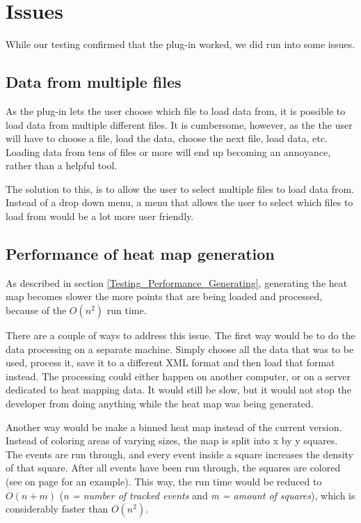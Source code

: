 \section{Issues}
\label{Issues}

While our testing confirmed that the plug-in worked, we did run into some issues.

\subsection{Data from multiple files}
\label{Issues_MoreFiles}

As the plug-in lets the user choose which file to load data from, it is possible to load data from multiple different files. It is cumbersome, however, as the the user will have to choose a file, load the data, choose the next file, load data, etc. Loading data from tens of files or more will end up becoming an annoyance, rather than a helpful tool.

The solution to this, is to allow the user to select multiple files to load data from. Instead of a drop down menu, a menu that allows the user to select which files to load from would be a lot more user friendly.

\subsection{Performance of heat map generation}
\label{Issues_GenerationPerformance}

As described in section \ref{Testing_Performance_Generating}, generating the heat map becomes slower the more points that are being loaded and processed, because of the $O(n^2)$ run time.

There are a couple of ways to address this issue. The first way would be to do the data processing on a separate machine. Simply choose all the data that was to be used, process it, save it to a different XML format and then load that format instead. The processing could either happen on another computer, or on a server dedicated to heat mapping data. It would still be slow, but it would not stop the developer from doing anything while the heat map was being generated.

Another way would be make a binned heat map instead of the current version. Instead of coloring areas of varying sizes, the map is split into x by y squares. The events are run through, and every event inside a square increases the density of that square. After all events have been run through, the squares are colored (see  on page \pageref{fig:HM_B} for an example). This way, the run time would be reduced to $O(n + m)$ (\textit{n = number of tracked events} and \textit{m = amount of squares}), which is considerably faster than $O(n^2)$.

